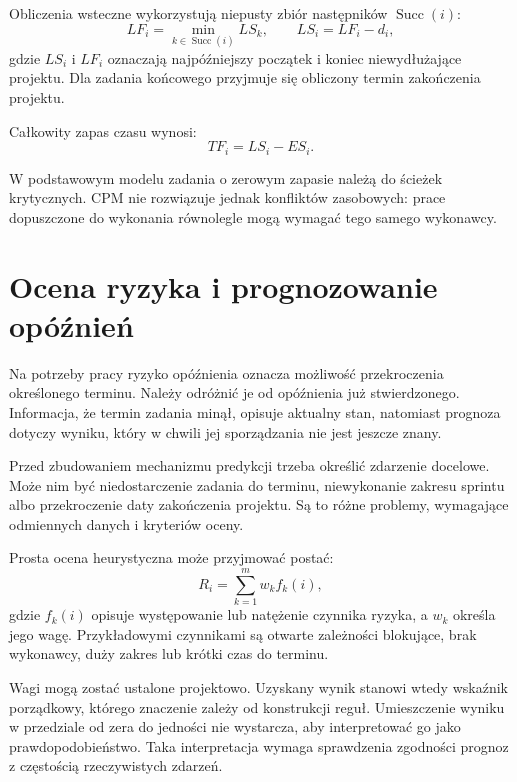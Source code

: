 Obliczenia wsteczne wykorzystują niepusty zbiór następników \(\operatorname{Succ}(i)\):
\begin{equation}
    LF_i = \min_{k \in \operatorname{Succ}(i)} LS_k,
    \qquad
    LS_i = LF_i - d_i,
    \label{eq:cpm-przejscie-wstecz}
\end{equation}
gdzie \(LS_i\) i \(LF_i\) oznaczają najpóźniejszy początek i koniec niewydłużające projektu. Dla zadania końcowego przyjmuje się obliczony termin zakończenia projektu.

Całkowity zapas czasu wynosi:
\begin{equation}
    TF_i = LS_i - ES_i.
    \label{eq:cpm-zapas-czasu}
\end{equation}

W podstawowym modelu zadania o zerowym zapasie należą do ścieżek krytycznych. CPM nie rozwiązuje jednak konfliktów zasobowych: prace dopuszczone do wykonania równolegle mogą wymagać tego samego wykonawcy.


\section{Ocena ryzyka i prognozowanie opóźnień}
\label{sec:ocena-ryzyka}

Na potrzeby pracy ryzyko opóźnienia oznacza możliwość przekroczenia określonego terminu. Należy odróżnić je od opóźnienia już stwierdzonego. Informacja, że termin zadania minął, opisuje aktualny stan, natomiast prognoza dotyczy wyniku, który w chwili jej sporządzania nie jest jeszcze znany.

Przed zbudowaniem mechanizmu predykcji trzeba określić zdarzenie docelowe. Może nim być niedostarczenie zadania do terminu, niewykonanie zakresu sprintu albo przekroczenie daty zakończenia projektu. Są to różne problemy, wymagające odmiennych danych i kryteriów oceny.

Prosta ocena heurystyczna może przyjmować postać:
\begin{equation}
    R_i = \sum_{k=1}^{m} w_k f_k(i),
    \label{eq:heurystyczna-ocena-ryzyka}
\end{equation}
gdzie \(f_k(i)\) opisuje występowanie lub natężenie czynnika ryzyka, a \(w_k\) określa jego wagę. Przykładowymi czynnikami są otwarte zależności blokujące, brak wykonawcy, duży zakres lub krótki czas do terminu.

Wagi mogą zostać ustalone projektowo. Uzyskany wynik stanowi wtedy wskaźnik porządkowy, którego znaczenie zależy od konstrukcji reguł. Umieszczenie wyniku w przedziale od zera do jedności nie wystarcza, aby interpretować go jako prawdopodobieństwo. Taka interpretacja wymaga sprawdzenia zgodności prognoz z częstością rzeczywistych zdarzeń.

